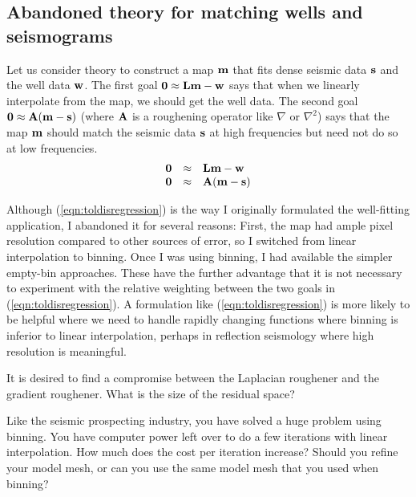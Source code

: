 \subsection{Abandoned theory for matching wells and seismograms}
\par
Let us consider theory to
construct a map $\bold m$ that fits dense seismic data
$\bold s$ and the well data $\bold w$.
The first goal
$\bold 0 \approx  \bold L \bold m - \bold w$
says that when we linearly interpolate from the map,
we should get the well data.
The second goal
$\bold 0 \approx \bold A (\bold m - \bold s)$
(where $\bold A$ is a roughening operator like $\nabla$ or $\nabla^2$)
says that the map $\bold m$ should match the seismic data $\bold s$
at high frequencies but need not do so at low frequencies.
\begin{equation}
        \begin{array}{lll}
        \bold 0 &\approx & \bold L \bold m - \bold w \\
        \bold 0 &\approx & \bold A (\bold m - \bold s)
        \label{eqn:toldisregression}
        \end{array}
\end{equation}
\par
Although (\ref{eqn:toldisregression}) is the way I originally formulated
the well-fitting application, I abandoned it for several reasons:
First, the map had ample pixel resolution compared to other sources of error,
so I switched from linear interpolation to binning.
Once I was using binning,
I had available the simpler empty-bin approaches.
These have the further advantage that it is not necessary
to experiment with the relative weighting between
the two goals in (\ref{eqn:toldisregression}).
A formulation like (\ref{eqn:toldisregression}) is more likely
to be helpful where we need to handle rapidly changing functions
where binning is inferior to linear interpolation,
perhaps in reflection seismology where high resolution is meaningful.
\begin{exer}
\item
        It is desired to find a compromise between
        the Laplacian roughener
        and the gradient roughener.
        What is the size of the residual space?
\item
        Like the seismic prospecting industry,
        you have solved a huge problem using binning.
        You have computer power left over
        to do a few iterations with linear interpolation.
        How much does the cost per iteration increase?
        Should you refine your model mesh,
        or can you use the same model mesh
        that you used when binning?
\end{exer}



